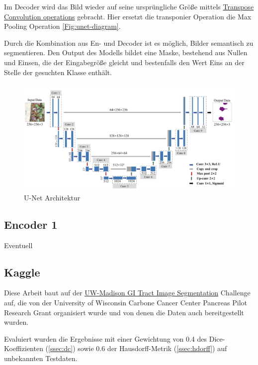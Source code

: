 Im Decoder wird das Bild wieder auf seine ursprüngliche Größe mittels 
\href{https://en.wikipedia.org/wiki/Deconvolution}{Transpose Convolution operations}
gebracht. Hier ersetzt die transponier Operation die Max Pooling Operation \autoref{Fig:unet-diagram}. 

Durch die Kombination aus En- und Decoder ist es möglich, Bilder semantisch zu segmentieren. Den Output des Modells bildet eine Maske, bestehend aus Nullen und Einsen, die der Eingabegröße gleicht und bestenfalls den Wert Eins an der Stelle der gesuchten Klasse enthält.

\begin{figure}[H]
	\begin{center}
		\includegraphics[width=430pt]{bilder/u-net-architecture}
		\caption{U-Net Architektur \citet{Zhang:2020}}\label{Fig:unet-diagram}
	\end{center}
\end{figure}


\subsection{Encoder 1}
Eventuell

\subsection{Kaggle}

Diese Arbeit baut auf der 
\href{https://www.kaggle.com/competitions/uw-madison-gi-tract-image-segmentation/overview/description}{UW-Madison GI Tract Image Segmentation}
Challenge auf, die von der \glqq University of Wisconsin Carbone Cancer Center Pancreas Pilot Research Grant \grqq organisiert wurde und von denen die Daten auch bereitgestellt wurden.

Evaluiert wurden die Ergebnisse mit einer Gewichtung von 0.4 des Dice-Koeffizienten  (\autoref{ssec:dc}) sowie 0.6 der Hausdorff-Metrik (\autoref{ssec:hdorff}) auf unbekannten Testdaten.


